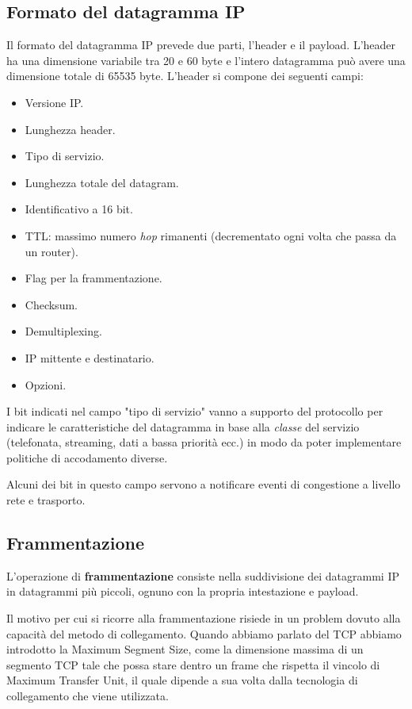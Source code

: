 \subsection{Formato del datagramma IP}
Il formato del datagramma IP prevede due parti, l'header e il payload. 
L'header ha una dimensione variabile tra 20 e 60 byte e l'intero
datagramma può avere una dimensione totale di 65535 byte. L'header si
compone dei seguenti campi:
\begin{itemize}
	\item Versione IP.
	\item Lunghezza header.
	\item Tipo di servizio.
	\item Lunghezza totale del datagram.
	\item Identificativo a 16 bit.
	\item TTL: massimo numero \emph{hop} rimanenti (decrementato ogni
		volta che passa da un router).
	\item Flag per la frammentazione.
	\item Checksum.
	\item Demultiplexing.
	\item IP mittente e destinatario.
	\item Opzioni.
\end{itemize}
I bit indicati nel campo "tipo di servizio" vanno a supporto del 
protocollo per indicare le caratteristiche del datagramma in base alla 
\emph{classe} del servizio (telefonata, streaming, dati a bassa
priorità ecc.) in modo da poter implementare politiche di accodamento
diverse.

Alcuni dei bit in questo campo servono a notificare eventi di
congestione a livello rete e trasporto.

\subsection{Frammentazione}
L'operazione di \textbf{frammentazione} consiste nella suddivisione dei
datagrammi IP in datagrammi più piccoli, ognuno con la propria
intestazione e payload.

Il motivo per cui si ricorre alla frammentazione risiede in un problem 
dovuto alla capacità del metodo di collegamento. Quando abbiamo parlato
del TCP abbiamo introdotto la Maximum Segment Size, come la dimensione 
massima di un segmento TCP tale che possa stare dentro un frame che
rispetta il vincolo di Maximum Transfer Unit, il quale dipende a sua
volta dalla tecnologia di collegamento che viene utilizzata.


